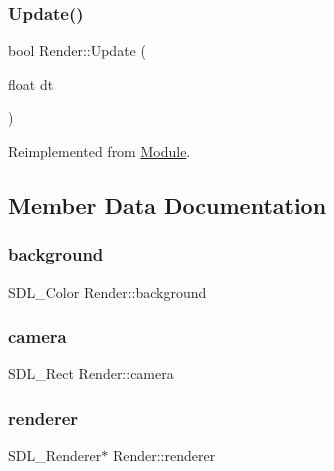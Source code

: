 \subsubsection{\texorpdfstring{Update()}{Update()}}
{\footnotesize\ttfamily bool Render\+::\+Update (\begin{DoxyParamCaption}\item[{float}]{dt }\end{DoxyParamCaption})\hspace{0.3cm}{\ttfamily [virtual]}}



Reimplemented from \mbox{\hyperlink{class_module_ac1a7b6dca73586b9cce2e67647af58d8}{Module}}.



\subsection{Member Data Documentation}
\mbox{\label{class_render_a14f0d9d0b7ae5afa71f5c4944b21e565}} 
\subsubsection{\texorpdfstring{background}{background}}
{\footnotesize\ttfamily S\+D\+L\+\_\+\+Color Render\+::background}

\mbox{\label{class_render_ada982fb8f63e807cdaa68154465edd2a}} 
\subsubsection{\texorpdfstring{camera}{camera}}
{\footnotesize\ttfamily S\+D\+L\+\_\+\+Rect Render\+::camera}

\mbox{\label{class_render_a83fdc275f915ff4a0aa699dd185c30e6}} 
\subsubsection{\texorpdfstring{renderer}{renderer}}
{\footnotesize\ttfamily S\+D\+L\+\_\+\+Renderer$\ast$ Render\+::renderer}

\mbox{\label{class_render_afafe629dbe3f79f8b443df6cb3958f41}} 
